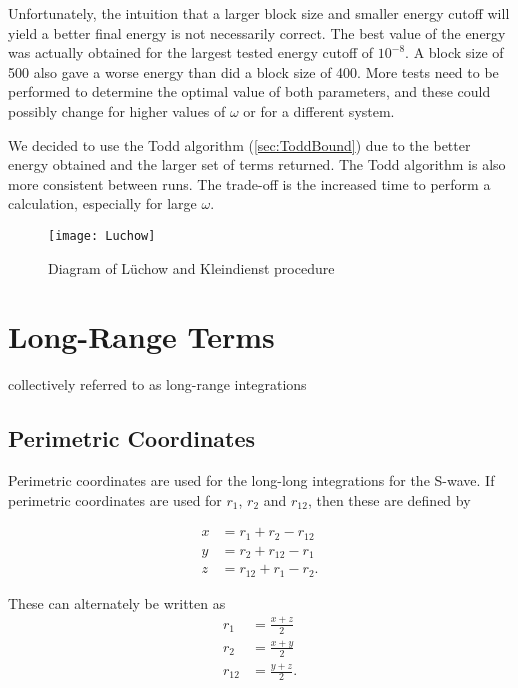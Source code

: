 \documentclass[Dissertation.tex]{subfiles}
\begin{document}
Unfortunately, the intuition that a larger block size and smaller energy cutoff will yield a better final energy is not necessarily correct. The best value of the energy was actually obtained for the largest tested energy cutoff of $10^{-8}$. A block size of 500 also gave a worse energy than did a block size of 400. More tests need to be performed to determine the optimal value of both parameters, and these could possibly change for higher values of $\omega$ or for a different system.

We decided to use the Todd algorithm (\ref{sec:ToddBound}) due to the better energy obtained and the larger set of terms returned. The Todd algorithm is also more consistent between runs. The trade-off is the increased time to perform a calculation, especially for large $\omega$.

\begin{figure}[H]
	\centering
	{\texttt{[image: Luchow]}}
	\caption{Diagram of L\"uchow and Kleindienst procedure}
	\label{fig:Luchow}
\end{figure}



\section{Long-Range Terms}
\label{sec:CompLong}

collectively referred to as long-range integrations


\subsection{Perimetric Coordinates}
\label{sec:PerimetricCoords}

Perimetric coordinates are used for the long-long integrations for the S-wave. If perimetric coordinates are used for $r_1$, $r_2$ and $r_{12}$, then these are defined by \cite{Armour1991}

\begin{align}
\label{eq:PerimetricCoords1}
\nonumber x &= r_1 + r_2 - r_{12} \\
\nonumber y &= r_2 + r_{12} - r_1 \\
z &= r_{12} + r_1 - r_2.
\end{align}

These can alternately be written as
\begin{align}
\label{eq:PerimetricCoords2}
\nonumber r_1 &= \frac{x+z}{2} \\
\nonumber r_2 &= \frac{x+y}{2} \\
\nonumber r_{12} &= \frac{y+z}{2}.
\end{align}
\end{document}
